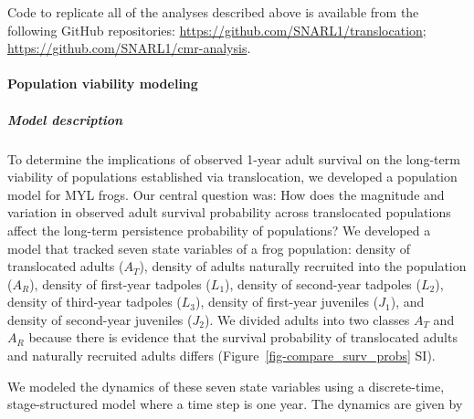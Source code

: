 \documentclass[
  letterpaper,
  DIV=11,
  numbers=noendperiod]{scrartcl}
\let\oldparagraph\paragraph
\renewcommand{\paragraph}[1]{\oldparagraph{#1}\mbox{}}
\let\oldsubparagraph\subparagraph
\renewcommand{\subparagraph}[1]{\oldsubparagraph{#1}\mbox{}}
\begin{document}
Code to replicate all of the analyses described above is available from
the following GitHub repositories:
\url{https://github.com/SNARL1/translocation};
\url{https://github.com/SNARL1/cmr-analysis}.

\hypertarget{population-viability-modeling}{%
\paragraph{Population viability
modeling}\label{population-viability-modeling}}

\hypertarget{model-description}{%
\subparagraph{Model description}\label{model-description}}

To determine the implications of observed 1-year adult survival on the
long-term viability of populations established via translocation, we
developed a population model for MYL frogs. Our central question was:
How does the magnitude and variation in observed adult survival
probability across translocated populations affect the long-term
persistence probability of populations? We developed a model that
tracked seven state variables of a frog population: density of
translocated adults (\(A_T\)), density of adults naturally recruited
into the population (\(A_R\)), density of first-year tadpoles (\(L_1\)),
density of second-year tadpoles (\(L_2\)), density of third-year
tadpoles (\(L_3\)), density of first-year juveniles (\(J_1\)), and
density of second-year juveniles (\(J_2\)). We divided adults into two
classes \(A_T\) and \(A_R\) because there is evidence that the survival
probability of translocated adults and naturally recruited adults
differs (Figure~\ref{fig-compare_surv_probs} SI).

We modeled the dynamics of these seven state variables using a
discrete-time, stage-structured model where a time step is one year. The
dynamics are given by
\end{document}
